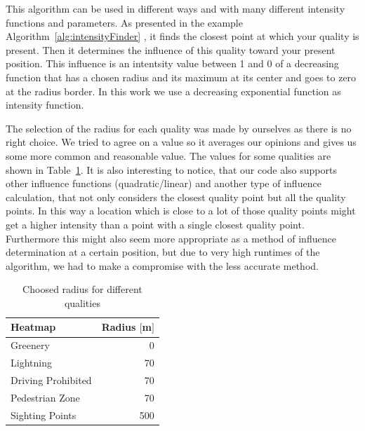 \documentclass[letterpaper]{article}
\begin{document}
\indent This algorithm can be used in different ways and with many different intensity functions and parameters. As presented in the example Algorithm~\ref{alg:intensityFinder} , it finds the closest point at which your quality is present. Then it determines the influence of this quality toward your present position. This influence is an intentsity value between 1 and 0 of a decreasing function that has a chosen radius and its maximum at its center and goes to zero at the radius border. In this work we use a decreasing exponential function as intensity function.

\indent The selection of the radius for each quality was made by ourselves as there is no right choice. We tried to agree on a value so it averages our opinions and gives us some more common and reasonable value. The values for some qualities are shown in Table~\ref{table:RadiusParam}. It is also interesting to notice, that our code also supports other influence functions (quadratic/linear) and another type of influence calculation, that not only considers the closest quality point but all the quality points. In this way a location which is close to a lot of those quality points might get a higher intensity than a point with a single closest quality point. Furthermore this might also seem more appropriate as a method of influence determination at a certain position, but due to very high runtimes of the algorithm, we had to make a compromise with the less accurate method.

\begin{table}[htb]
    \centering
        \begin{tabular}{lr}
            Heatmap & Radius $[$m$]$\\\hline
            Greenery & 0\\
            Lightning & 70\\
            Driving Prohibited & 70\\
            Pedestrian Zone & 70\\
            Sighting Points & 500\\
    \end{tabular}
    \caption{Choosed radius for different qualities}
    \label{table:RadiusParam}
\end{table}
\end{document}
